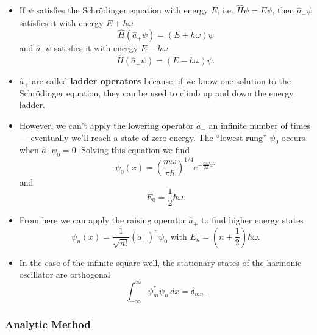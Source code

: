 \documentclass{article}
\begin{document}
\begin{itemize}
  \item If $\psi$ satisfies the Schrödinger equation with energy $E$, i.e. $\hat{H} \psi = E \psi$, then $\hat{a}_+ \psi$ satisfies it with energy $E + h \omega$ \[\hat{H} (\hat{a}_+ \psi) = (E + h \omega) \psi\] and $\hat{a}_- \psi$ satisfies it with energy $E - h \omega$ \[\hat{H} (\hat{a}_- \psi) = (E - h \omega) \psi.\]

  \item $\hat{a}_\pm$ are called \textbf{ladder operators} because, if we know one solution to the Schrödinger equation, they can be used to climb up and down the energy ladder.

  \item However, we can't apply the lowering operator $\hat{a}_-$ an infinite number of times — eventually we'll reach a state of zero energy. The ``lowest rung'' $\psi_0$ occurs when $\hat{a}_- \psi_0 = 0$. Solving this equation we find \[\psi_0(x) = \left( \frac{m \omega}{\pi \hbar} \right)^{1 / 4} e^{-\frac{m \omega}{2 \hbar} x^2}\] and \[E_0 = \frac{1}{2} \hbar \omega.\]

  \item From here we can apply the raising operator $\hat{a}_+$ to find higher energy states \[\psi_n(x) = \frac{1}{\sqrt{n!}} (\hat{a}_+)^n \psi_0 \text{ with } E_n = \left( n + \frac{1}{2} \right) \hbar \omega.\]

  \item In the case of the infinite square well, the stationary states of the harmonic oscillator are orthogonal \[\int_{-\infty}^\infty \psi_m^* \psi_n \,d x = \delta_{m n}.\]
\end{itemize}

\subsubsection{Analytic Method}
\end{document}
